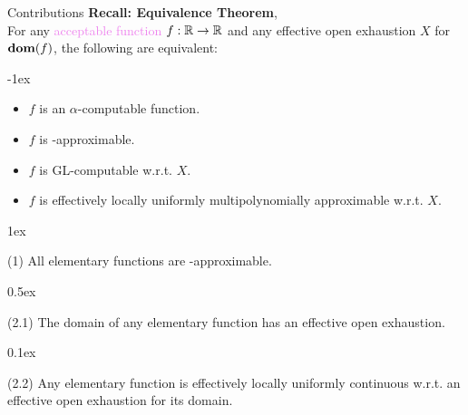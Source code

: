 \begin{frame}{Contributions}
    \vspace{-1em}
    {\color{gray}
    \textcolor{OliveGreen}{\textbf{Recall: Equivalence Theorem}, \citep{ModelOfCompForPartFunc_MingQuanFuAndJeffZucker}}\\
    For any \textcolor{violet}{acceptable function} $f:\mathbb{R}\to\mathbb{R}$ and any {effective open exhaustion} $X$ for $\mathbf{dom}(f)$, the following are equivalent:}

    \kern-1ex
        \begin{itemize}
            \setlength\itemsep{-3pt}\color{gray}
            \item $f$ is an $\alpha$-computable function.
            \item $f$ is \WhileCC-approximable.
            \item $f$ is GL-computable w.r.t. $X$.
            \item $f$ is effectively locally uniformly multipolynomially approximable w.r.t. $X$.
        \end{itemize}

    \kern1ex
    \begin{ntheorem}(1)
        All elementary functions are \WhileCC-approximable.
    \end{ntheorem}

    \kern0.5ex
    \begin{ntheorem}(2.1)
        The domain of any elementary function has an effective open exhaustion.
    \end{ntheorem}
    \pause
    
    \kern0.1ex
    \begin{ntheorem}(2.2)
        Any elementary function is {effectively locally uniformly continuous} w.r.t.\null{} an effective open exhaustion for its domain.
    \end{ntheorem}
\end{frame}
